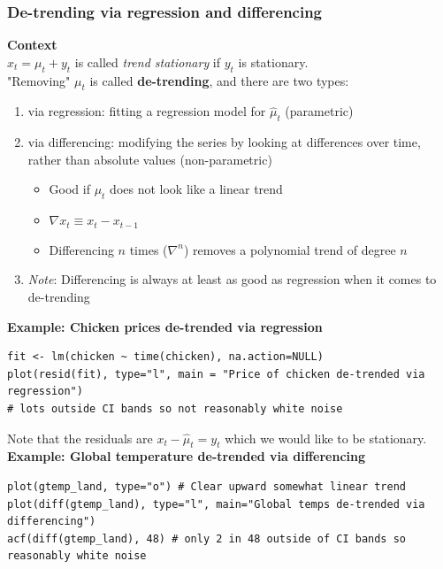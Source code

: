 \documentclass[11pt]{article}
\newcommand{\noi}{\noindent}
\begin{document}
\subsubsection{De-trending via regression and differencing}
\noi \textbf{Context} \\
\noi $x_t = \mu_t + y_t$ is called \textit{trend stationary} if $y_t$ is stationary. \\

\noi "Removing" $\mu_t$ is called \textbf{de-trending}, and there are two types:
\begin{enumerate}
    \item via regression: fitting a regression model for $\hat \mu_t$ (parametric)
    \item via differencing: modifying the series by looking at differences over time, rather than absolute values (non-parametric)
        \begin{itemize}
            \item Good if $\mu_t$ does not look like a linear trend
            \item $\nabla x_t \equiv x_t - x_{t-1}$
            \item Differencing $n$ times ($\nabla^n$) removes a polynomial trend of degree $n$
        \end{itemize}
    \item \textit{Note}: Differencing is always at least as good as regression when it comes to de-trending
\end{enumerate} \phantom{i}

\noi \textbf{Example: Chicken prices de-trended via regression}
\begin{lstlisting}
fit <- lm(chicken ~ time(chicken), na.action=NULL)
plot(resid(fit), type="l", main = "Price of chicken de-trended via regression")
# lots outside CI bands so not reasonably white noise
\end{lstlisting}
\noi Note that the residuals are $x_t - \hat \mu_t = y_t$ which we would like to be stationary. \\

\noi \textbf{Example: Global temperature de-trended via differencing}
\begin{lstlisting}
plot(gtemp_land, type="o") # Clear upward somewhat linear trend
plot(diff(gtemp_land), type="l", main="Global temps de-trended via differencing")
acf(diff(gtemp_land), 48) # only 2 in 48 outside of CI bands so reasonably white noise
\end{lstlisting}
\end{document}
